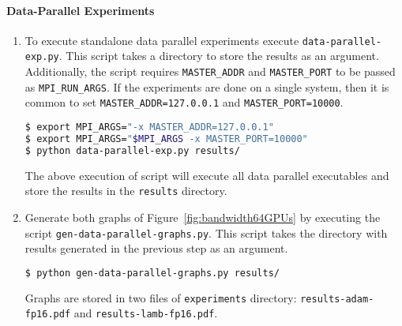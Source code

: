 \paragraph{Data-Parallel Experiments}
\begin{enumerate}
  \item To execute standalone data parallel experiments execute \texttt{data-parallel-exp.py}. This script takes a directory to store the results as an argument.
  Additionally, the script requires \texttt{MASTER\_ADDR} and \texttt{MASTER\_PORT} to be passed as \texttt{MPI\_RUN\_ARGS}. If the experiments are done on a single system, then it is common to set \texttt{MASTER\_ADDR=127.0.0.1} and \texttt{MASTER\_PORT=10000}.

  {\footnotesize
\begin{lstlisting}[language=bash]
$ export MPI_ARGS="-x MASTER_ADDR=127.0.0.1"
$ export MPI_ARGS="$MPI_ARGS -x MASTER_PORT=10000"
$ python data-parallel-exp.py results/
\end{lstlisting}
}

  The above execution of script will execute all data parallel executables and store the results in the \texttt{results} directory.

  \item Generate both graphs of Figure~\ref{fig:bandwidth64GPUs} by executing the script \texttt{gen-data-parallel-graphs.py}. This script takes the directory with results generated in the previous step as an argument.
  
{\footnotesize
\begin{lstlisting}[language=bash]
$ python gen-data-parallel-graphs.py results/
\end{lstlisting}
}

Graphs are stored in two files of \texttt{experiments} directory: \texttt{results-adam-fp16.pdf} and \texttt{results-lamb-fp16.pdf}.
\end{enumerate}

